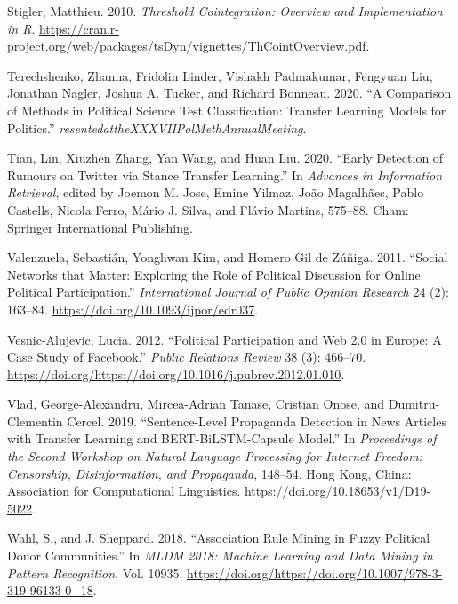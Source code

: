 \documentclass[12pt,]{article}
\begin{document}
\leavevmode\hypertarget{ref-tsdyn}{}%
Stigler, Matthieu. 2010. \emph{Threshold Cointegration: Overview and
Implementation in R}.
\url{https://cran.r-project.org/web/packages/tsDyn/vignettes/ThCointOverview.pdf}.

\leavevmode\hypertarget{ref-terechshenko2020}{}%
Terechshenko, Zhanna, Fridolin Linder, Vishakh Padmakumar, Fengyuan Liu,
Jonathan Nagler, Joshua A. Tucker, and Richard Bonneau. 2020. ``A
Comparison of Methods in Political Science Test Classification: Transfer
Learning Models for Politics.''
\emph{resentedattheXXXVIIPolMethAnnualMeeting}.

\leavevmode\hypertarget{ref-tian2020}{}%
Tian, Lin, Xiuzhen Zhang, Yan Wang, and Huan Liu. 2020. ``Early
Detection of Rumours on Twitter via Stance Transfer Learning.'' In
\emph{Advances in Information Retrieval}, edited by Joemon M. Jose,
Emine Yilmaz, João Magalhães, Pablo Castells, Nicola Ferro, Mário J.
Silva, and Flávio Martins, 575--88. Cham: Springer International
Publishing.

\leavevmode\hypertarget{ref-valenzuela2011}{}%
Valenzuela, Sebastián, Yonghwan Kim, and Homero Gil de Zúñiga. 2011.
``Social Networks that Matter: Exploring the Role of Political
Discussion for Online Political Participation.'' \emph{International
Journal of Public Opinion Research} 24 (2): 163--84.
\url{https://doi.org/10.1093/ijpor/edr037}.

\leavevmode\hypertarget{ref-vesnic2012}{}%
Vesnic-Alujevic, Lucia. 2012. ``Political Participation and Web 2.0 in
Europe: A Case Study of Facebook.'' \emph{Public Relations Review} 38
(3): 466--70.
\url{https://doi.org/https://doi.org/10.1016/j.pubrev.2012.01.010}.

\leavevmode\hypertarget{ref-vlad2019}{}%
Vlad, George-Alexandru, Mircea-Adrian Tanase, Cristian Onose, and
Dumitru-Clementin Cercel. 2019. ``Sentence-Level Propaganda Detection in
News Articles with Transfer Learning and BERT-BiLSTM-Capsule Model.'' In
\emph{Proceedings of the Second Workshop on Natural Language Processing
for Internet Freedom: Censorship, Disinformation, and Propaganda},
148--54. Hong Kong, China: Association for Computational Linguistics.
\url{https://doi.org/10.18653/v1/D19-5022}.

\leavevmode\hypertarget{ref-wahl2018}{}%
Wahl, S., and J. Sheppard. 2018. ``Association Rule Mining in Fuzzy
Political Donor Communities.'' In \emph{MLDM 2018: Machine Learning and
Data Mining in Pattern Recognition}. Vol. 10935.
\url{https://doi.org/https://doi.org/10.1007/978-3-319-96133-0_18}.
\end{document}
